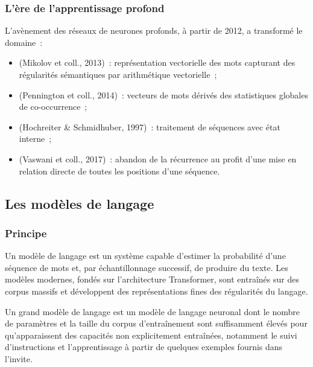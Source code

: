\subsubsection{L'ère de l'apprentissage profond}

L'avènement des réseaux de neurones profonds, à partir de 2012, a transformé le
domaine~:

\begin{itemize}
  \item {} (Mikolov et coll., 2013)~: représentation
        vectorielle des mots capturant des régularités sémantiques par
        arithmétique vectorielle~;
  \item {} (Pennington et coll., 2014)~: vecteurs de mots dérivés
        des statistiques globales de co-occurrence~;
  \item {} (Hochreiter \&
        Schmidhuber, 1997)~: traitement de séquences avec état interne~;
  \item {} (Vaswani et
        coll., 2017)~: abandon de la récurrence au profit d'une mise en relation
        directe de toutes les positions d'une séquence.
\end{itemize}

\subsection{Les modèles de langage}

\subsubsection{Principe}

Un modèle de langage est un système capable d'estimer la probabilité d'une
séquence de mots et, par échantillonnage successif, de produire du texte. Les
modèles modernes, fondés sur l'architecture Transformer, sont entraînés sur des
corpus massifs et développent des représentations fines des régularités du
langage.

\begin{btpdef}
Un grand modèle de langage est un modèle de langage neuronal dont le nombre de
paramètres et la taille du corpus d'entraînement sont suffisamment élevés pour
qu'apparaissent des capacités non explicitement entraînées, notamment le suivi
d'instructions et l'apprentissage à partir de quelques exemples fournis dans
l'invite.
\end{btpdef}

